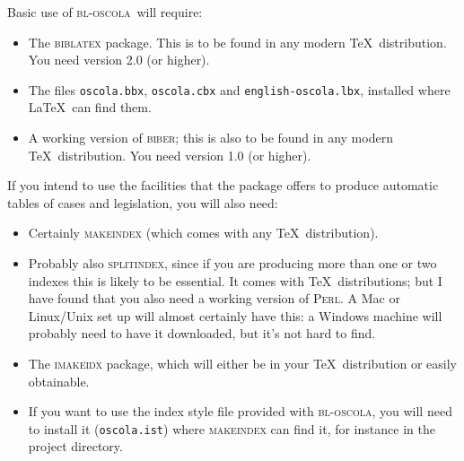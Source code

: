 \documentclass[a4paper,
               11pt,
	       DIV=1,			   
	       footinclude=false]
	      {scrartcl}
\newcommand{\oscola}{\textsc{bl-oscola}}
\begin{document}
Basic use of \oscola\ will require:
\begin{itemize}
\item The \textsc{biblatex} package. This is to be found in any modern
  \TeX\ distribution. You need version 2.0 (or higher).
\item The files \texttt{oscola.bbx}, \texttt{oscola.cbx} and
  \texttt{english-oscola.lbx}, installed where \LaTeX\ can find them.
\item A working version of \textsc{biber}; this is also to be found in
  any modern \TeX\ distribution. You need version 1.0 (or higher).
\end{itemize}

If you intend to use the facilities that the package offers to produce
automatic tables of cases and legislation, you will also need:
\begin{itemize}
\item Certainly \textsc{makeindex} (which comes with any \TeX\ distribution).
\item Probably also \textsc{splitindex}, since if you are producing
  more than one or two indexes this is likely to be essential. It
  comes with \TeX\ distributions; but I have found that you also need
  a working version of \textsc{Perl}. A Mac or Linux\slash Unix set up
  will almost certainly have this: a Windows machine will probably
  need to have it downloaded, but it's not hard to find.
\item The \textsc{imakeidx} package, which will either be in your
  \TeX\ distribution or easily obtainable.
\item If you want to use the index style file provided with \oscola,
  you will need to install it (\texttt{oscola.ist}) where
  \textsc{makeindex} can find it, for instance in the project
  directory.
\end{itemize}
\end{document}
